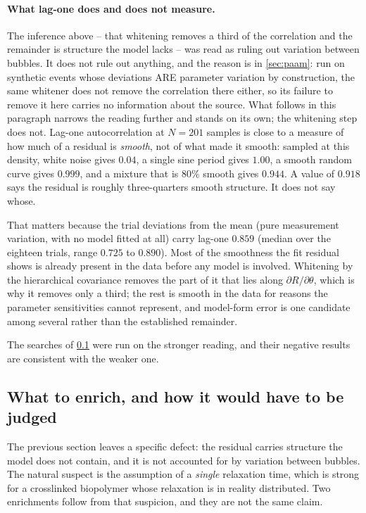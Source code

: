 \documentclass[10pt]{article}
\begin{document}
\paragraph{What lag-one does and does not measure.} The inference above -- that whitening
removes a third of the correlation and the remainder is structure the model lacks -- was read
as ruling out variation between bubbles. It does not rule out anything, and the reason is in
\cref{sec:paam}: run on synthetic events whose deviations ARE parameter variation by
construction, the same whitener does not remove the correlation there either, so its failure to
remove it here carries no information about the source. What follows in this paragraph narrows
the reading further and stands on its own; the whitening step does not. Lag-one autocorrelation at $N = 201$
samples is close to a measure of how much of a residual is \emph{smooth}, not of what made
it smooth: sampled at this density, white noise gives $0.04$, a single sine period gives
$1.00$, a smooth random curve gives $0.999$, and a mixture that is $80\%$ smooth gives
$0.944$. A value of $0.918$ says the residual is roughly three-quarters smooth structure. It
does not say whose.

That matters because the trial deviations from the mean (pure measurement variation, with
no model fitted at all) carry lag-one $0.859$ (median over the eighteen trials, range
$0.725$ to $0.890$). Most of the smoothness the fit residual shows is already present in the
data before any model is involved. Whitening by the hierarchical covariance removes the part
of it that lies along $\partial R/\partial\theta$, which is why it removes only a third; the
rest is smooth in the data for reasons the parameter sensitivities cannot represent, and
model-form error is one candidate among several rather than the established remainder.

The searches of \cref{sec:enrich} were run on the stronger reading, and their negative
results are consistent with the weaker one.

\subsection{What to enrich, and how it would have to be judged}
\label{sec:enrich}

The previous section leaves a specific defect: the residual carries structure the model does
not contain, and it is not accounted for by variation between bubbles. The natural suspect is
the assumption of a \emph{single} relaxation time, which is strong for a crosslinked
biopolymer whose relaxation is in reality distributed. Two enrichments follow from that
suspicion, and they are not the same claim.
\end{document}
